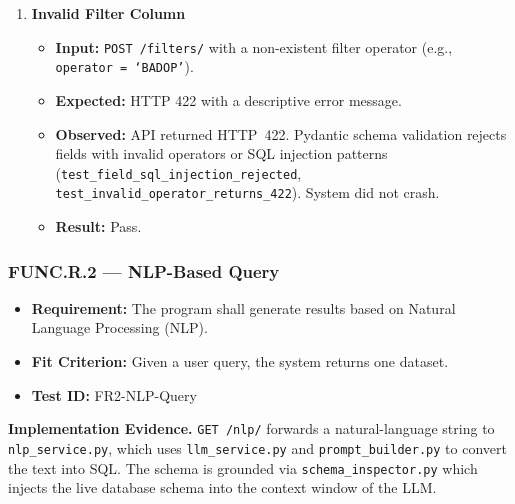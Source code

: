 \documentclass[12pt, titlepage]{article}
\begin{document}
\begin{enumerate}[label=\textbf{FR1-T\arabic*:}, leftmargin=*, labelsep=1em]
  \item \textbf{Invalid Filter Column}
  \begin{itemize}
    \item \textbf{Input:} \texttt{POST /filters/} with a non-existent filter operator
      (e.g., \texttt{operator = `BADOP'}).
    \item \textbf{Expected:} HTTP 422 with a descriptive error message.
    \item \textbf{Observed:} API returned HTTP~422. Pydantic schema validation rejects fields with
      invalid operators or SQL injection patterns
      (\texttt{test\_\allowbreak{}field\_\allowbreak{}sql\_\allowbreak{}injection\_\allowbreak{}rejected},
      \texttt{test\_\allowbreak{}invalid\_\allowbreak{}operator\_\allowbreak{}returns\_422}). System did not crash.
    \item \textbf{Result:} Pass.
  \end{itemize}

\end{enumerate}

\subsubsection{FUNC.R.2 --- NLP-Based Query}

\begin{itemize}
  \item \textbf{Requirement:} The program shall generate results based on Natural Language Processing (NLP).
  \item \textbf{Fit Criterion:} Given a user query, the system returns one dataset.
  \item \textbf{Test ID:} FR2-NLP-Query
\end{itemize}

\begin{sloppypar}
\noindent\textbf{Implementation Evidence.}
\texttt{GET /nlp/} forwards a natural-language string to \texttt{nlp\_service.py}, which uses
\texttt{llm\_service.py} and \texttt{prompt\_builder.py} to convert the text into SQL. The schema is
grounded via \texttt{schema\_inspector.py} which injects the live database schema into the context window of the LLM.
\end{sloppypar}
\end{document}
